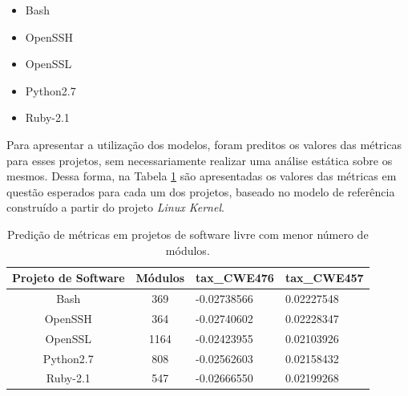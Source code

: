 \begin{itemize}
 \item Bash
 \item OpenSSH
 \item OpenSSL
 \item Python2.7
 \item Ruby-2.1
\end{itemize}

Para apresentar a utilização dos modelos, foram preditos os valores das métricas
para esses projetos, sem necessariamente realizar uma análise estática sobre os
mesmos. Dessa forma, na Tabela \ref{tab:exemplos} são apresentadas os valores
das métricas em questão esperados para cada um dos projetos, baseado no modelo de
referência construído a partir do projeto \textit{Linux Kernel}.

\begin{table}[h]
 \centering
 \begin{tabular}{ccll}
  \hline
  \rowcolor[HTML]{EFEFEF} 
  Projeto de Software & Módulos &
  \multicolumn{1}{c}{\cellcolor[HTML]{EFEFEF}tax\_CWE476} &
  \multicolumn{1}{c}{\cellcolor[HTML]{EFEFEF}tax\_CWE457} \\ \hline
  Bash                & 369     & -0.02738566
  & 0.02227548                                              \\ \hline
  OpenSSH             & 364     & -0.02740602
  & 0.02228347                                              \\ \hline
  OpenSSL             & 1164    & -0.02423955
  & 0.02103926                                              \\ \hline
  Python2.7           & 808     & -0.02562603
  & 0.02158432                                              \\ \hline
  Ruby-2.1            & 547     & -0.02666550
  & 0.02199268                                             \\ \hline
 \end{tabular}
 \caption{Predição de métricas em projetos de software livre com menor número
 de módulos.}
 \label{tab:exemplos}
\end{table}


